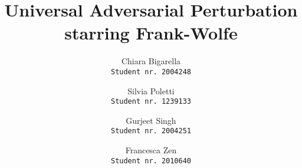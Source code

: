 \documentclass[10pt,twocolumn,letterpaper]{article}
\begin{document}
\title{Universal Adversarial Perturbation starring Frank-Wolfe}
\author{Chiara Bigarella\\{\tt\footnotesize Student nr. 2004248}\and Silvia Poletti\\{\tt\footnotesize Student nr. 1239133}\and Gurjeet Singh\\{\tt\footnotesize Student nr. 2004251}\and Francesca Zen\\{\tt\footnotesize Student nr. 2010640}}
\maketitle









\end{document}
